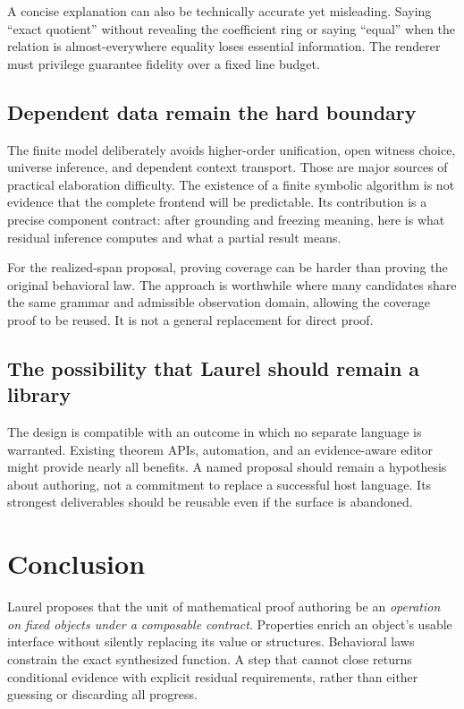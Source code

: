 \documentclass[11pt,a4paper]{article}
\theoremstyle{definition}
\theoremstyle{remark}
\begin{document}
A concise explanation can also be technically accurate yet misleading. Saying ``exact quotient'' without revealing the coefficient ring or saying ``equal'' when the relation is almost-everywhere equality loses essential information. The renderer must privilege guarantee fidelity over a fixed line budget.

\subsection{Dependent data remain the hard boundary}
The finite model deliberately avoids higher-order unification, open witness choice, universe inference, and dependent context transport. Those are major sources of practical elaboration difficulty. The existence of a finite symbolic algorithm is not evidence that the complete frontend will be predictable. Its contribution is a precise component contract: after grounding and freezing meaning, here is what residual inference computes and what a partial result means.

For the realized-span proposal, proving coverage can be harder than proving the original behavioral law. The approach is worthwhile where many candidates share the same grammar and admissible observation domain, allowing the coverage proof to be reused. It is not a general replacement for direct proof.

\subsection{The possibility that Laurel should remain a library}
The design is compatible with an outcome in which no separate language is warranted. Existing theorem APIs, automation, and an evidence-aware editor might provide nearly all benefits. A named proposal should remain a hypothesis about authoring, not a commitment to replace a successful host language. Its strongest deliverables should be reusable even if the surface is abandoned.

\section{Conclusion}
Laurel proposes that the unit of mathematical proof authoring be an \emph{operation on fixed objects under a composable contract}. Properties enrich an object's usable interface without silently replacing its value or structures. Behavioral laws constrain the exact synthesized function. A step that cannot close returns conditional evidence with explicit residual requirements, rather than either guessing or discarding all progress.
\end{document}
